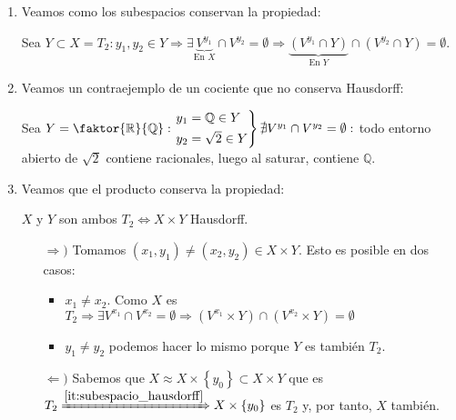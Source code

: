 \begin{demo}
\begin{enumerate}
    \item\label{it:subespacio_hausdorff} Veamos como los subespacios conservan la propiedad: 

    Sea $Y \subset X = T_2: y_1, y_2 \in Y \Rightarrow \exists \underbrace{V^{y_1}}_{\text{En } X}  \cap V^{y_2} = \emptyset \Rightarrow \underbrace{\left( V^{y_1} \cap Y \right)}_{\text{En } Y}  \cap \left( V^{y_2} \cap Y \right) = \emptyset$.

    \item Veamos un contraejemplo de un cociente que no conserva Hausdorff: 

    Sea $Y = \faktor{\mathbb{R}}{\mathbb{Q}}: \begin{rcases}
        y_1 = \mathbb{Q} \in Y\\
        y_2 = \sqrt{2} \in Y
    \end{rcases} \nexists V^{y_1} \cap V^{y_2} = \emptyset: $ todo entorno abierto de $\sqrt{2}$ contiene racionales, luego al saturar, contiene $\mathbb{Q}$.

    \item Veamos que el producto conserva la propiedad: 

    $X$ y $Y$ son ambos $T_2 \Leftrightarrow X \times Y$ Hausdorff.
    \begin{itemize}
        \item[$\Rightarrow)$] Tomamos $\left( x_1, y_1 \right) \neq \left( x_2, y_2 \right) \in X \times Y$. Esto es posible en dos casos:
        \begin{itemize}
            \item $x_1 \neq x_2$. Como $X$ es $T_2 \Rightarrow \exists V^{x_1} \cap V^{x_2} = \emptyset \Rightarrow \left( V^{x_1} \times Y \right) \cap \left( V^{x_2} \times Y \right) = \emptyset$ 
            \item $y_1 \neq y_2$ podemos hacer lo mismo porque $Y$ es también $T_2$.
        \end{itemize}

    \item[$\Leftarrow)$] Sabemos que $X \approx X \times \left\{ y_0 \right\} \subset X \times Y$ que es $T_2 \xRightarrow{\ref{it:subespacio_hausdorff}} X \times \left\{ y_0 \right\}$ es $T_2$ y, por tanto, $X$ también.
    \end{itemize} 
    \begin{figure}[H]
        \centering
\end{figure}
\end{enumerate}
\end{demo}
